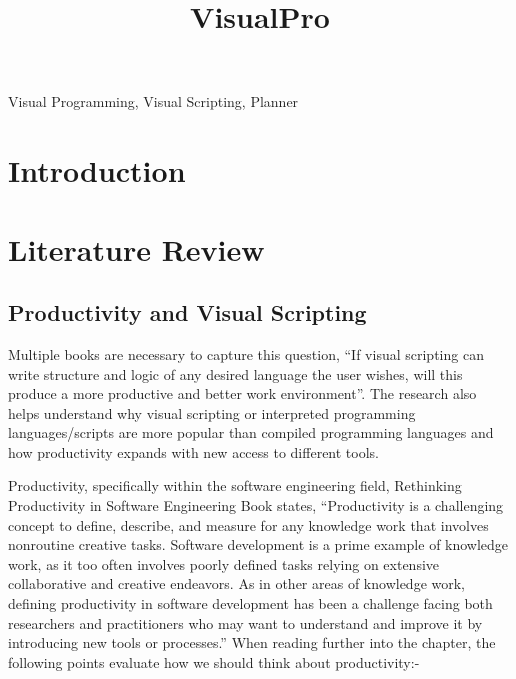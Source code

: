 \documentclass[conference]{IEEEtran}
\begin{document}
	\title{VisualPro}

	\author{
	}

     \maketitle
    
    \thispagestyle{plain}
    \pagestyle{plain}
    
    \tableofcontents
	  \vspace{.5cm}
    \begin{abstract}
    
    \end{abstract}

    \begin{IEEEkeywords}
        Visual Programming, Visual Scripting, Planner
    \end{IEEEkeywords}

    \section{Introduction}

    \section{Literature Review}
      \subsection{Productivity and Visual Scripting}
      Multiple books are necessary to capture this question, ``If visual scripting can write structure and logic of any desired language the user wishes, will this produce a more productive and better work environment''. The research also helps understand why visual scripting or interpreted programming languages/scripts are more popular than compiled programming languages and how productivity expands with new access to different tools.

      Productivity, specifically within the software engineering field, Rethinking Productivity in Software Engineering Book states, ``Productivity is a challenging concept to define, describe, and measure for any knowledge work that involves nonroutine creative tasks. Software development is a prime example of knowledge work, as it too often involves poorly defined tasks relying on extensive collaborative and creative endeavors. As in other areas of knowledge work, defining productivity in software development has been a challenge facing both researchers and practitioners who may want to understand and improve it by introducing new tools or processes.'' When reading further into the chapter, the following points evaluate how we should think about productivity:-
\end{document}
